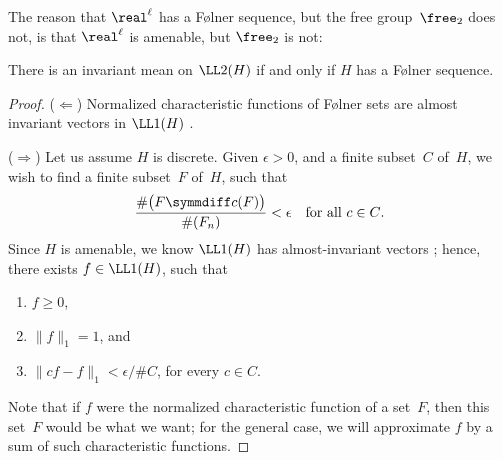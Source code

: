 The reason that $\real^\ell$ has a F\o lner sequence, but the free group~$\free_2$ does not, is that $\real^\ell$ is amenable, but $\free_2$ is not:

\begin{prop}[($\ref{AmenEquiv-Vectors} \Leftrightarrow \ref{AmenEquiv-Folner}$)] \label{Amen<>Folner}
There is an invariant mean on $\LL2(H)$ if and only if $H$ has a F\o lner sequence.
\end{prop}

\begin{proof}
($\Leftarrow$) Normalized characteristic functions of F\o lner sets are almost invariant vectors in $\LL1(H)$ .

($\Rightarrow$) Let us assume $H$ is discrete.
Given $\epsilon > 0$, and a finite subset~$C$ of~$H$, we wish to find a finite subset~$F$ of~$H$, such that
	$$ \frac{ \# \bigl( F \symmdiff c(F) \bigr) }{ \#(F_n) } < \epsilon 
	\quad \text{for all $c \in C$} .$$
Since $H$ is amenable, we know $\LL1(H)$ has almost-invariant vectors ; hence, there exists $f \in \LL1(H)$, such that 
\noprelistbreak
	\begin{enumerate}
	\item $f \ge 0$,
	\item $\| f \|_1 = 1$,
	and
	\item $\|c f - f \|_1 < \epsilon/\#C$, for every $c \in C$.
	\end{enumerate}
Note that if $f$ were the normalized characteristic function of a set~$F$, then this set~$F$ would be what we want; for the general case, we will approximate $f$ by a sum of such characteristic functions.


\end{proof}
